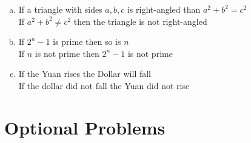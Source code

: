 \documentclass[]{article}
\begin{document}
\begin{enumerate}
\begin{enumerate}[(a)]
		\item If a triangle with sides $a, b, c$ is right-angled than $a^2 + b^2 = c^2$ \\
			\hspace*{\fill} If $a^2 + b^2 \neq c^2$ then the triangle is not right-angled
		\item If $2^n - 1$ is prime then so is $n$ \\
			\hspace*{\fill} If $n$ is not prime then $2^n - 1$ is not prime
		\item If the Yuan rises the Dollar will fall \\
			\hspace*{\fill} If the dollar did not fall the Yuan did not rise
	\end{enumerate}
\end{enumerate}

\section {Optional Problems}
\end{document}
